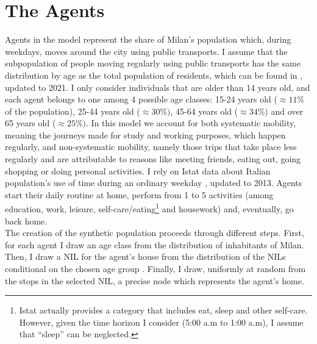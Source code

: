 
 \section{The Agents}\label{sec:3.3}
 
Agents in the model represent the share of Milan's population which, during weekdays, moves around the city using public transports. I assume that the subpopulation of people moving regularly using public transports has the same distribution by age as the total population of residents, which can be found in \cite{site18}, updated to 2021. I only consider individuals that are older than 14 years old, and each agent belongs to one among 4 possible age classes: 15-24 years old ($\approx 11\%$ of the population), 25-44 years old ($\approx 30\%)$, 45-64 years old ($\approx 34\%)$ and over 65 years old ($\approx 25\%)$.
In this model we account for both systematic mobility, meaning the journeys made for study and working purposes, which happen regularly, and non-systematic mobility, namely those trips that take place less regularly and are attributable to reasons like meeting friends, eating out, going shopping or doing personal activities. I rely on Istat data about Italian population's use of time during an ordinary weekday \cite{site14}, updated to 2013. Agents start their daily routine at home, perform from 1 to 5 activities (among education, work, leisure, self-care/eating\footnote{Istat actually provides a category that includes eat, sleep and other self-care. However, given the time horizon I consider (5:00 a.m  to 1:00 a.m), I assume that “sleep” can be neglected.} and housework) and, eventually, go back home. \\

The creation of the synthetic population proceeds through different steps. First, for each agent I draw an age class from the distribution of inhabitants of Milan. Then, I draw a NIL for the agent's house from the distribution of the NILs conditional on the chosen age group \cite{site18}. Finally, I draw, uniformly at random from the stops in the selected NIL, a precise node which represents the agent’s home. 


